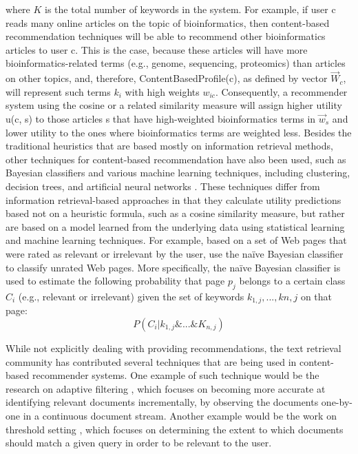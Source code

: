 where $K$ is the total number of keywords in the system.
For example, if user c reads many online articles on the topic of bioinformatics, then content-based recommendation techniques will be able to recommend other bioinformatics articles to user c. This is the case, because these articles will have more bioinformatics-related terms (e.g., genome, sequencing, proteomics) than articles on other topics,  and, therefore, ContentBasedProfile(c), as defined by vector $\vec{W}_c$, will represent such terms $k_i$ with high weights $w_{ic}$. Consequently, a recommender system using the cosine or a related similarity measure will assign higher utility u(c, s) to those articles s that have high-weighted bioinformatics terms in $\vec{w}_s $ and lower utility to the ones where bioinformatics terms are weighted less.
Besides the traditional heuristics that are based mostly on information retrieval methods, other techniques for content-based recommendation have also been used, such as Bayesian classifiers  \citep{recom_70}  \citep{recom_77} and various machine learning techniques, including clustering, decision trees, and artificial neural networks \citep{recom_77}. These techniques differ from information retrieval-based approaches in that they calculate utility predictions based not on a heuristic formula,  such as a cosine similarity measure, but rather are based on a model learned from the underlying data using statistical learning and machine learning techniques. For example, based on a set of Web pages that were rated as relevant or irrelevant by the user, \citep{recom_77} use the naïve Bayesian classifier \citep{recom_31} to classify unrated Web pages. More specifically, the naïve Bayesian classifier is used to estimate the following probability that page $p_j$ belongs to a certain class $C_i$ (e.g., relevant or irrelevant) given the set of keywords $k_{1,j} , ..., k{n,j}$ on that page:
\begin{equation}\label{eq:7}
P(C_i|k_{1,j} \&...\&K_{n,j})
\end{equation}

While not explicitly dealing with providing recommendations, the text retrieval community has contributed several techniques that are being used in content-based recommender systems. One example of such technique would be the research on adaptive filtering \citep{recom_101} \citep{recom_112}, which focuses on becoming more accurate at identifying relevant documents incrementally, by observing the documents one-by-one in a continuous document stream. Another example would be the work on threshold setting \citep{recom_84} \citep{recom_111}, which focuses on determining the extent to which documents should match a given query in order to be relevant to the user.

